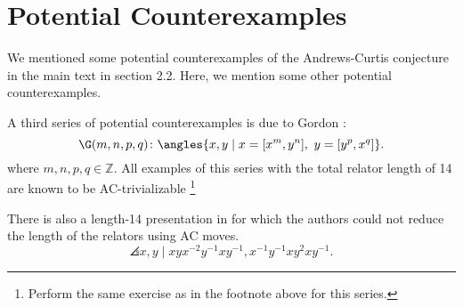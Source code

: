 
\section{Potential Counterexamples}

We mentioned some potential counterexamples of the Andrews-Curtis conjecture in the main text in section 2.2. Here, we mention some other potential counterexamples. 

A third series of potential counterexamples is due to Gordon \cite{Brown}:
\[
\G(m, n, p, q) \colon \angles{x, y \mid x = [x^m, y^n],\ y = [y^p, x^q]}.
\]
where $m,n,p,q \in \mathbb{Z}$.
All examples of this series with the total relator length of 14 are known
to be AC-trivializable \cite{Bowman-McCaul}
\footnote{Perform the same exercise as in the footnote above for this series.}
\newline

There is also a length-14 presentation in \cite{MMS} for which the authors could not reduce the length of the relators using AC moves.
\[
\angles{x, y \mid xyx^{-2}y^{-1} xy^{-1}, x^{-1} y^{-1} x y^2 x y^{-1}}.
\]
